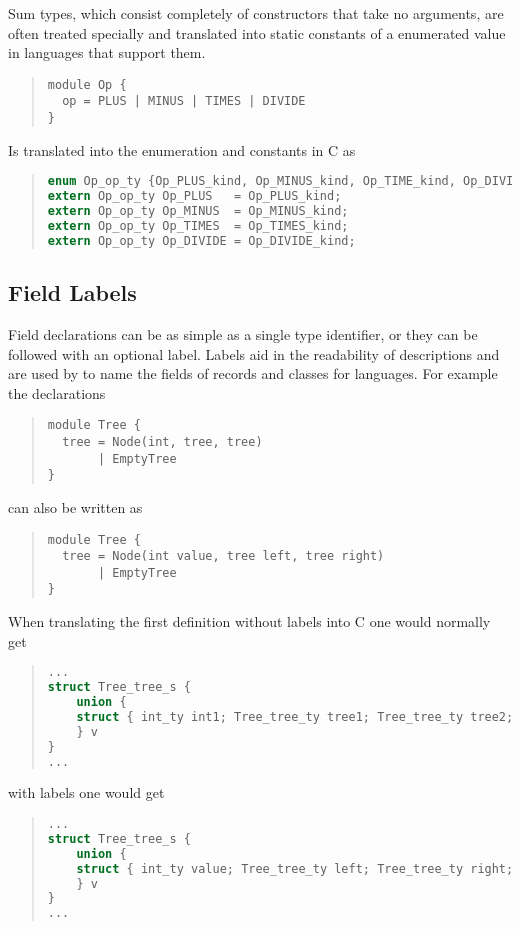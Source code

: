 Sum types, which consist completely of constructors that take no arguments,
are often treated specially and translated into static constants of a
enumerated value in languages that support them.
\begin{quote}\begin{lstlisting}[language=ASDL]
module Op {
  op = PLUS | MINUS | TIMES | DIVIDE 
}
\end{lstlisting}\end{quote}%

Is translated into the enumeration and constants in C as
\begin{quote}\begin{lstlisting}[language=c]
enum Op_op_ty {Op_PLUS_kind, Op_MINUS_kind, Op_TIME_kind, Op_DIVIDE_kind};
extern Op_op_ty Op_PLUS   = Op_PLUS_kind;
extern Op_op_ty Op_MINUS  = Op_MINUS_kind;
extern Op_op_ty Op_TIMES  = Op_TIMES_kind;
extern Op_op_ty Op_DIVIDE = Op_DIVIDE_kind;
\end{lstlisting}\end{quote}%

\subsection{Field Labels}
Field declarations can be as simple as a single type identifier, or they can
be followed with an optional label. Labels aid in the readability of
descriptions and are used by \asdlgen{} to name the fields of records
and classes for languages. For example the declarations
\begin{quote}\begin{lstlisting}[language=ASDL]
module Tree {
  tree = Node(int, tree, tree)
       | EmptyTree
}
\end{lstlisting}\end{quote}%
can also be written as
\begin{quote}\begin{lstlisting}[language=ASDL]
module Tree {
  tree = Node(int value, tree left, tree right)
       | EmptyTree
}
\end{lstlisting}\end{quote}%

When translating the first definition without labels 
into C one would normally get
\begin{quote}\begin{lstlisting}[language=c]
...
struct Tree_tree_s {
    union {
    struct { int_ty int1; Tree_tree_ty tree1; Tree_tree_ty tree2; } ...
    } v
}
...
\end{lstlisting}\end{quote}%
with labels one would get
\begin{quote}\begin{lstlisting}[language=c]
...
struct Tree_tree_s {
    union {
    struct { int_ty value; Tree_tree_ty left; Tree_tree_ty right; } ...
    } v
}
...
\end{lstlisting}\end{quote}%

